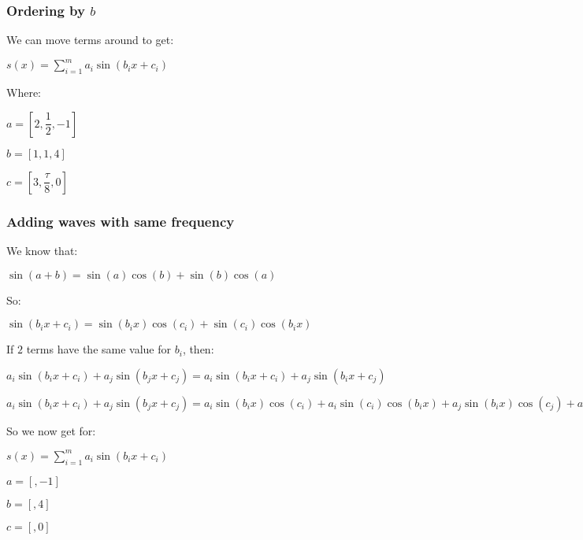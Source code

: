 \subsubsection{Ordering by \(b\)}

We can move terms around to get:

\(s(x)=\sum^m_{i=1}a_i\sin(b_ix+c_i)\)

Where:

\(a=[2,\dfrac{1}{2},-1]\)

\(b=[1,1,4]\)

\(c=[3,\dfrac{\tau}{8},0]\)

\subsubsection{Adding waves with same frequency}

We know that:

\(\sin(a+b)=\sin(a)\cos(b)+\sin(b)\cos(a)\)

So:

\(\sin(b_ix+c_i)=\sin(b_ix)\cos(c_i)+\sin(c_i)\cos(b_ix)\)

If \(2\) terms have the same value for \(b_i\), then:

\(a_i\sin(b_ix+c_i)+a_j\sin(b_jx+c_j)=a_i\sin(b_ix+c_i)+a_j\sin(b_ix+c_j)\)

\(a_i\sin(b_ix+c_i)+a_j\sin(b_jx+c_j)=a_i\sin(b_ix)\cos(c_i)+a_i\sin(c_i)\cos(b_ix)+a_j\sin(b_ix)\cos(c_j)+a_j\sin(c_j)\cos(b_ix)\)

So we now get for:

\(s(x)=\sum^m_{i=1}a_i\sin(b_ix+c_i)\)

\(a=[,-1]\)

\(b=[,4]\)

\(c=[,0]\)

